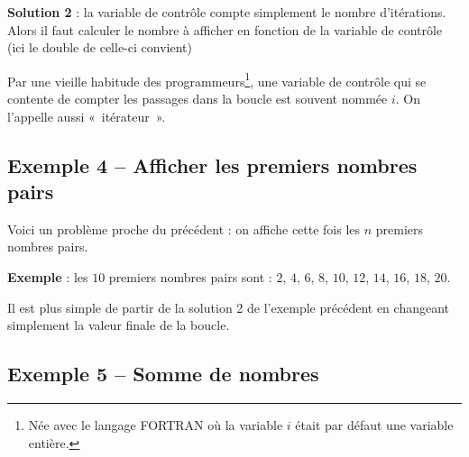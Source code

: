 
		\textbf{Solution 2} : 
		la variable de contrôle compte simplement le nombre d'itérations.
		Alors il faut calculer le nombre à afficher en fonction de la variable
		de contrôle (ici le double de celle-ci convient)


		Par une vieille habitude des programmeurs\footnote{Née avec 
		le langage FORTRAN où la variable $i$ était par défaut une variable entière.},
		une variable de contrôle qui se contente de compter les passages dans
		la boucle est souvent nommée $i$. 
		On l'appelle aussi «~itérateur~».

	\subsection{Exemple 4 -- Afficher les premiers nombres pairs}

		Voici un problème proche du précédent : 
		on affiche cette fois les $n$ premiers nombres pairs.
		
		\textbf{Exemple} : 
		les $10$ premiers nombres pairs sont : $2$, $4$, $6$, $8$, $10$, $12$, $14$, $16$, $18$, $20$.
		
		Il est plus simple de partir de la solution 2 de l'exemple précédent
		en changeant simplement la valeur finale de la boucle.


	\subsection{Exemple 5 -- Somme de nombres}

